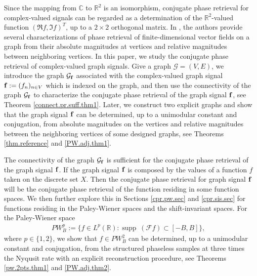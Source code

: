 \documentclass[12pt,oneside,reqno]{amsart}
\newcommand{\R}{\mathbb{R}}
\newcommand{\C}{\mathbb{C}}
\numberwithin{equation}{section}
\begin{document}
	
	Since the mapping from $\C$ to $\R^2$ is an isomorphism, conjugate phase retrieval for complex-valued signals can be regarded as a determination of the $\R^2$-valued function $(\Re f, \Im f)^{T}$, up to a $2\times 2$ orthogonal matrix. In \cite{chen2022phase}, the authors provide several characterizations of phase retrieval of  finite-dimensional vector fields on a graph from their absolute magnitudes at vertices and relative magnitudes between neighboring vertices. In this paper,  we study the conjugate phase retrieval of complex-valued graph signals. %
	Give a graph $\mathcal{G}=(V,E)$, we  introduce the graph $\mathcal{G}_{\bf f}$ associated with the complex-valued graph signal ${\bf f}:=(f_n)_{n\in V}$ which is indexed on the graph, and then use the connectivity of the graph $\mathcal{G}_{\bf f}$ to characterize the conjugate phase retrieval of the graph signal $\bf f$, see Theorem \ref{connect.pr.suff.thm1}. %
	Later, we construct two explicit graphs and show that the graph signal  $\bf f$ can be determined, up to a unimodular constant and conjugation, from absolute magnitudes on the vertices and relative magnitudes between the neighboring vertices of some designed graphs, see Theorems \ref{thm.reference} and \ref{PW.adj.thm1}.	
	
	
	The connectivity of the graph ${\mathcal G}_{\bf f}$ is sufficient for the conjugate phase retrieval  of the graph signal $\bf f$. If  the graph signal $\bf f$ is composed by  the values of a function $f$ taken on the discrete set $X$. Then the conjugate phase retrieval for graph signal $\bf f$ will be the conjugate phase retrieval of the function residing in some function spaces. We then further explore this in Sections \ref{cpr.pw.sec} and \ref{cpr.sis.sec} for functions residing in the  Paley-Wiener spaces and the shift-invariant spaces. %
	For the Paley-Wiener space
	\begin{align}\label{PW.def}
		PW_B^{p}:= \{ f\in L^p(\R): \operatorname{supp} \ (\mathcal{F}f)\subset [-B,B]\}, 
	\end{align}
    where $p\in \{1,2\}$,
	we show that  $f\in PW_B^2$ can be determined, up to a  unimodular constant and conjugation, from the structured phaseless samples at three times the Nyqusit rate with an explicit reconstruction procedure, see Theorems  \ref{pw.2pts.thm1} and \ref{PW.adj.thm2}.  
	
\end{document}
